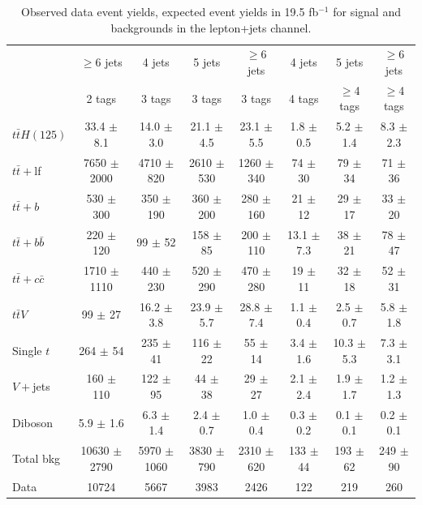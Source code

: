 \begin{table}[!ht]
\begin{center}
  \noindent
  \small
    \begin{tabular}{|l|c|c|c|c|c|c|c|} \hline
& $\geq$6 jets & 4 jets & 5 jets & $\geq$6 jets & 4 jets & 5 jets & $\geq$6 jets \\
& 2 tags & 3 tags & 3 tags & 3 tags & 4 tags & $\geq$4 tags & $\geq$4 tags \\ \hline \hline
$t\bar{t}H(125)$ & 33.4 $\pm$ 8.1 & 14.0 $\pm$ 3.0 & 21.1 $\pm$ 4.5 & 23.1 $\pm$ 5.5 & 1.8 $\pm$ 0.5 & 5.2 $\pm$ 1.4 & 8.3 $\pm$ 2.3 \\
 \hline
$t\bar{t}+$lf & 7650 $\pm$ 2000 & 4710 $\pm$ 820 & 2610 $\pm$ 530 & 1260 $\pm$ 340 & 74 $\pm$ 30 & 79 $\pm$ 34 & 71 $\pm$ 36 \\
$t\bar{t}+b$ & 530 $\pm$ 300 & 350 $\pm$ 190 & 360 $\pm$ 200 & 280 $\pm$ 160 & 21 $\pm$ 12 & 29 $\pm$ 17 & 33 $\pm$ 20 \\
$t\bar{t}+b\bar{b}$ & 220 $\pm$ 120 & 99 $\pm$ 52 & 158 $\pm$ 85 & 200 $\pm$ 110 & 13.1 $\pm$ 7.3 & 38 $\pm$ 21 & 78 $\pm$ 47 \\
$t\bar{t}+c\bar{c}$ & 1710 $\pm$ 1110 & 440 $\pm$ 230 & 520 $\pm$ 290 & 470 $\pm$ 280 & 19 $\pm$ 11 & 32 $\pm$ 18 & 52 $\pm$ 31 \\
$t\bar{t}V$ & 99 $\pm$ 27 & 16.2 $\pm$ 3.8 & 23.9 $\pm$ 5.7 & 28.8 $\pm$ 7.4 & 1.1 $\pm$ 0.4 & 2.5 $\pm$ 0.7 & 5.8 $\pm$ 1.8 \\
Single $t$ & 264 $\pm$ 54 & 235 $\pm$ 41 & 116 $\pm$ 22 & 55 $\pm$ 14 & 3.4 $\pm$ 1.6 & 10.3 $\pm$ 5.3 & 7.3 $\pm$ 3.1 \\
$V+$jets & 160 $\pm$ 110 & 122 $\pm$ 95 & 44 $\pm$ 38 & 29 $\pm$ 27 & 2.1 $\pm$ 2.4 & 1.9 $\pm$ 1.7 & 1.2 $\pm$ 1.3 \\
Diboson & 5.9 $\pm$ 1.6 & 6.3 $\pm$ 1.4 & 2.4 $\pm$ 0.7 & 1.0 $\pm$ 0.4 & 0.3 $\pm$ 0.2 & 0.1 $\pm$ 0.1 & 0.2 $\pm$ 0.1 \\
 \hline
Total bkg & 10630 $\pm$ 2790 & 5970 $\pm$ 1060 & 3830 $\pm$ 790 & 2310 $\pm$ 620 & 133 $\pm$ 44 & 193 $\pm$ 62 & 249 $\pm$ 90 \\
 \hline
Data & 10724 & 5667 & 3983 & 2426 & 122 & 219 & 260 \\
\hline
\end{tabular}
    \caption{Observed data event yields, expected event yields in 19.5 fb$^{-1}$ for signal and backgrounds in the lepton+jets channel.}
    \label{tab:dataMC_LJeventyield}
\end{center}
\end{table}


